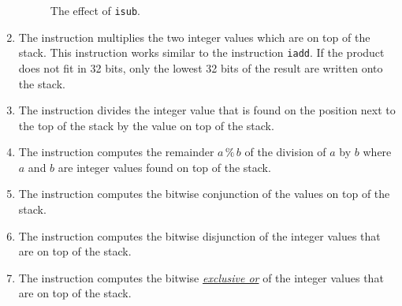 \begin{enumerate}
\setlength{\unitlength}{0.5cm}
\begin{figure}[!ht]
  \centering
{}
  \caption{The effect of \texttt{isub}.}
  \label{fig:ijvm-sub}
\end{figure}

\item The instruction 
      multiplies the two integer values which are on top of the stack.  This instruction works similar to
      the instruction \texttt{iadd}.  If the product does not fit in 32 bits, only the lowest 32 bits of
      the result are written onto the stack. 
\item The instruction 
      divides the integer value that is found on the position next to the  top of the stack by the value
      on top of the stack. 
\item The instruction 
      computes the remainder $a \,\texttt{\%}\, b$ of the division of $a$ by $b$ where $a$ and $b$ are
      integer values found on top of the stack.
\item The instruction 
      computes the bitwise conjunction of the values on top of the stack.
\item The instruction 
      computes the bitwise disjunction of the integer values that are on top of the stack.
\item The instruction 
      computes the bitwise \href{http://en.wikipedia.org/wiki/Exclusive_or}{\emph{exclusive or}} of
      the integer values that are on top of the stack. 
\end{enumerate}

